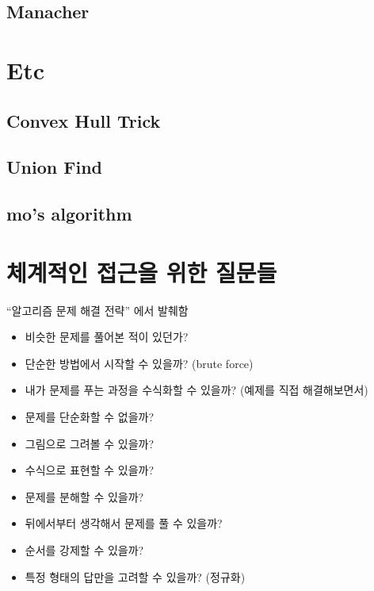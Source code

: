 \documentclass[10pt,landscape,a4paper,twocolumn]{article}
\begin{document}
\subsection{Manacher}


\section{Etc}

\subsection{Convex Hull Trick}


\subsection{Union Find}


\subsection{mo's algorithm}


\section{체계적인 접근을 위한 질문들}

``알고리즘 문제 해결 전략'' 에서 발췌함
\begin{itemize}
  \item 비슷한 문제를 풀어본 적이 있던가?
  \item 단순한 방법에서 시작할 수 있을까? (brute force)
  \item 내가 문제를 푸는 과정을 수식화할 수 있을까? (예제를 직접 해결해보면서)
  \item 문제를 단순화할 수 없을까?
  \item 그림으로 그려볼 수 있을까?
  \item 수식으로 표현할 수 있을까?
  \item 문제를 분해할 수 있을까?
  \item 뒤에서부터 생각해서 문제를 풀 수 있을까?
  \item 순서를 강제할 수 있을까?
  \item 특정 형태의 답만을 고려할 수 있을까? (정규화)
\end{itemize}
\end{document}
